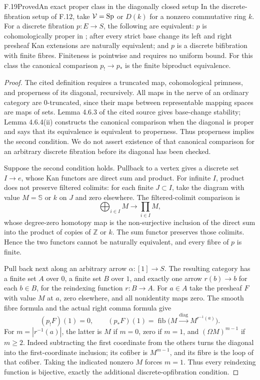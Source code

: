 \begin{claim}{F.19}{Proved}{An exact proper class in the diagonally closed setup}
In the discrete-fibration setup of F.12, take $\mathcal V=\mathrm{Sp}$ or $D(k)$ for a nonzero commutative ring $k$. For a discrete fibration $p:E\to S$, the following are equivalent: $p$ is cohomologically proper in \citet[Definition 4.6.1(b)]{EFHeyerMann2024}; after every strict base change its left and right presheaf Kan extensions are naturally equivalent; and $p$ is a discrete bifibration with finite fibres. Finiteness is pointwise and requires no uniform bound. For this class the canonical comparison $p_!\to p_*$ is the finite biproduct equivalence.
\end{claim}
\begin{proof}
The cited definition requires a truncated map, cohomological primness, and properness of its diagonal, recursively. All maps in the nerve of an ordinary category are $0$-truncated, since their maps between representable mapping spaces are maps of sets. Lemma 4.6.3 of the cited source gives base-change stability; Lemma 4.6.4(ii) constructs the canonical comparison when the diagonal is proper and says that its equivalence is equivalent to properness. Thus properness implies the second condition. We do not assert existence of that canonical comparison for an arbitrary discrete fibration before its diagonal has been checked.

Suppose the second condition holds. Pullback to a vertex gives a discrete set $I\to e$, whose Kan functors are direct sum and product. For infinite $I$, product does not preserve filtered colimits: for each finite $J\subset I$, take the diagram with value $M=\mathbb S$ or $k$ on $J$ and zero elsewhere. The filtered-colimit comparison is
\[
 \bigoplus_{i\in I}M\longrightarrow\prod_{i\in I}M,
\]
whose degree-zero homotopy map is the non-surjective inclusion of the direct sum into the product of copies of $\mathbb Z$ or $k$. The sum functor preserves those colimits. Hence the two functors cannot be naturally equivalent, and every fibre of $p$ is finite.

Pull back next along an arbitrary arrow $\alpha:[1]\to S$. The resulting category has a finite set $A$ over $0$, a finite set $B$ over $1$, and exactly one arrow $r(b)\to b$ for each $b\in B$, for the reindexing function $r:B\to A$. For $a\in A$ take the presheaf $F$ with value $M$ at $a$, zero elsewhere, and all nonidentity maps zero. The smooth fibre formula and the actual right comma formula give
\[
 (p_!F)(1)=0,\qquad
 (p_*F)(1)=\operatorname{fib}\bigl(M\xrightarrow{\mathrm{diag}}M^{r^{-1}(a)}\bigr).
\]
For $m=|r^{-1}(a)|$, the latter is $M$ if $m=0$, zero if $m=1$, and $(\Omega M)^{m-1}$ if $m\geq2$. Indeed subtracting the first coordinate from the others turns the diagonal into the first-coordinate inclusion; its cofiber is $M^{m-1}$, and its fibre is the loop of that cofiber. Taking the indicated nonzero $M$ forces $m=1$. Thus every reindexing function is bijective, exactly the additional discrete-opfibration condition.


\end{proof}
